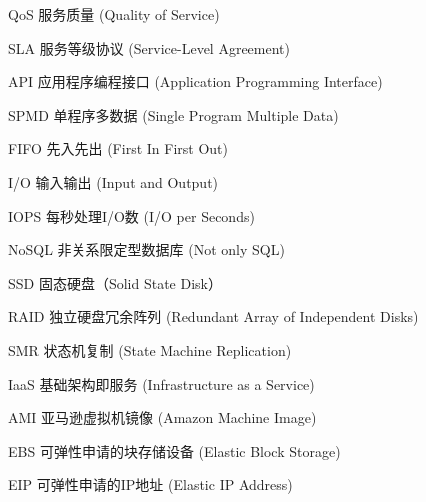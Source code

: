 \begin{denotation}[3cm]
\item[QoS] 服务质量 (Quality of Service)
\item[SLA] 服务等级协议 (Service-Level Agreement)
\item[API] 应用程序编程接口 (Application Programming Interface)
\item[SPMD] 单程序多数据 (Single Program Multiple Data)
\item[FIFO] 先入先出 (First In First Out)
\item[I/O] 输入输出 (Input and Output)
\item[IOPS] 每秒处理I/O数 (I/O per Seconds)
\item[NoSQL] 非关系限定型数据库 (Not only SQL)
\item[SSD] 固态硬盘（Solid State Disk）
\item[RAID] 独立硬盘冗余阵列 (Redundant Array of Independent Disks)
\item[SMR] 状态机复制 (State Machine Replication)
\item[IaaS] 基础架构即服务 (Infrastructure as a Service)
\item[AMI] 亚马逊虚拟机镜像 (Amazon Machine Image)
\item[EBS] 可弹性申请的块存储设备 (Elastic Block Storage)
\item[EIP] 可弹性申请的IP地址 (Elastic IP Address)
\end{denotation}
